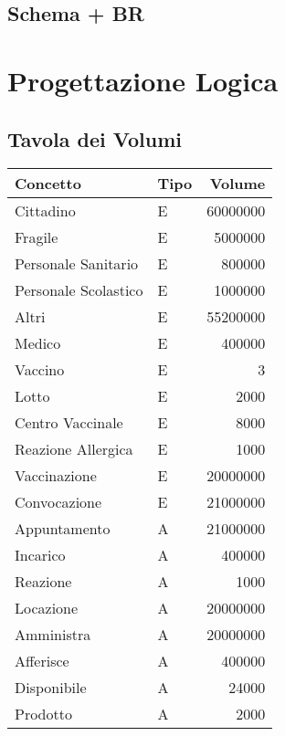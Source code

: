 \documentclass[11pt]{article}
\begin{document}
\subsection{Schema + BR}
\label{sec:org81a53a8}

\section{Progettazione Logica}
\label{sec:orgbc06cd7}

\subsection{Tavola dei Volumi}
\label{sec:org7c40d58}
\begin{center}
\begin{tabular}{llr}
Concetto & Tipo & Volume\\
\hline
Cittadino & E & 60000000\\
Fragile & E & 5000000\\
Personale Sanitario & E & 800000\\
Personale Scolastico & E & 1000000\\
Altri & E & 55200000\\
Medico & E & 400000\\
Vaccino & E & 3\\
Lotto & E & 2000\\
Centro Vaccinale & E & 8000\\
Reazione Allergica & E & 1000\\
Vaccinazione & E & 20000000\\
Convocazione & E & 21000000\\
Appuntamento & A & 21000000\\
Incarico & A & 400000\\
Reazione & A & 1000\\
Locazione & A & 20000000\\
Amministra & A & 20000000\\
Afferisce & A & 400000\\
Disponibile & A & 24000\\
Prodotto & A & 2000\\
\hline
\end{tabular}
\end{center}
\end{document}
